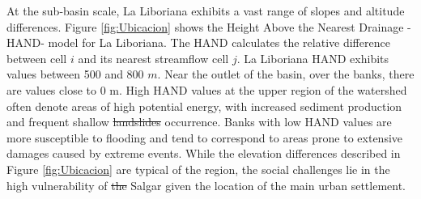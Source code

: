 \documentclass[hess, manuscript]{copernicus} %
\providecommand{\DIFadd}[1]{{\protect\color{blue}\uwave{#1}}} %
\providecommand{\DIFdel}[1]{{\protect\color{red}\sout{#1}}}                      %
\providecommand{\DIFaddbegin}{} %
\providecommand{\DIFaddend}{} %
\providecommand{\DIFdelbegin}{} %
\providecommand{\DIFdelend}{} %
\begin{document}
At the sub-basin scale, La Liboriana exhibits a vast range of slopes and altitude differences.  Figure \ref{fig:Ubicacion} shows the Height Above the Nearest Drainage -HAND- model   \citep{Renno2008} for La Liboriana. The HAND calculates the relative difference between cell $i$ and its nearest streamflow cell $j$.  La Liboriana HAND exhibits values between 500 and 800 \DIFdelbegin \DIFdel{$m$}\DIFdelend \DIFaddbegin \DIFadd{$\text{m}$}\DIFaddend . Near the outlet of the basin, over the banks, there are values close to 0 m.  High HAND values at the upper region of the watershed often denote areas of high potential energy, with increased sediment production and frequent shallow \DIFdelbegin \DIFdel{landslides }\DIFdelend \DIFaddbegin \DIFadd{landslide }\DIFaddend occurrence.  Banks with low HAND values are more susceptible to flooding and tend to correspond to areas prone to extensive damages caused by extreme events.  While the elevation differences described in Figure \ref{fig:Ubicacion} are typical of the region, the social challenges lie in the high vulnerability of \DIFdelbegin \DIFdel{the }\DIFdelend Salgar given the location of the main urban settlement.\\ 
\end{document}
